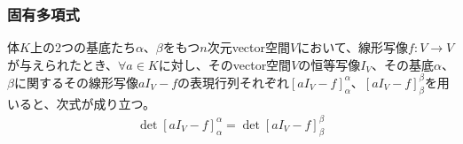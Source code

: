 \documentclass[dvipdfmx]{jsarticle}
\begin{document}
\subsubsection{固有多項式}%
\begin{thm}\label{2.2.2.4}
体$K$上の2つの基底たち$\alpha$、$\beta$をもつ$n$次元vector空間$V$において、線形写像$f:V \rightarrow V$が与えられたとき、$\forall a \in K$に対し、そのvector空間$V$の恒等写像$I_{V}$、その基底$\alpha$、$\beta$に関するその線形写像$aI_{V} - f$の表現行列それぞれ$\left[ aI_{V} - f \right]_{\alpha}^{\alpha}$、$\left[ aI_{V} - f \right]_{\beta}^{\beta}$を用いると、次式が成り立つ。
\begin{align*}
\det\left[ aI_{V} - f \right]_{\alpha}^{\alpha} = \det\left[ aI_{V} - f \right]_{\beta}^{\beta}
\end{align*}
\end{thm}
\end{document}
